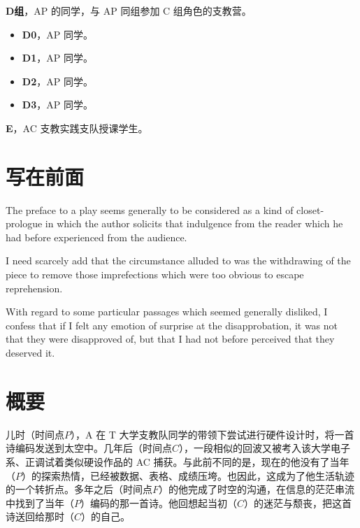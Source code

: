 \documentclass[11pt,a4paper,oneside]{memoir}
\begin{document}
\textbf{D组}，AP 的同学，与 AP 同组参加 C 组角色的支教营。
\begin{itemize}
    \item \textbf{D0}，AP 同学。
    \item \textbf{D1}，AP 同学。
    \item \textbf{D2}，AP 同学。
    \item \textbf{D3}，AP 同学。
\end{itemize}

\textbf{E}，AC 支教实践支队授课学生。



\chapter*{写在前面}

The preface to a play seems generally to be considered as a kind of closet-prologue in which the author solicits that indulgence from the reader which he had before experienced from the audience.

I need scarcely add that the circumstance alluded to was the withdrawing of the piece to remove those imprefections which were too obvious to escape reprehension.

With regard to some particular passages which seemed generally disliked, I confess that if I felt any emotion of surprise at the disapprobation, it was not that they were disapproved of, but that I had not before perceived that they deserved it.

\clearpage
{}

\chapter*{概要}

儿时（时间点\(P\)），A 在 T 大学支教队同学的带领下尝试进行硬件设计时，将一首诗编码发送到太空中。几年后（时间点\(C\)），一段相似的回波又被考入该大学电子系、正调试着类似硬设作品的 AC 捕获。与此前不同的是，现在的他没有了当年（\(P\)）的探索热情，已经被数据、表格、成绩压垮。也因此，这成为了他生活轨迹的一个转折点。多年之后（时间点\(F\)）的他完成了时空的沟通，在信息的茫茫串流中找到了当年（\(P\)）编码的那一首诗。他回想起当初（\(C\)）的迷茫与颓丧，把这首诗送回给那时（\(C\)）的自己。
\end{document}
